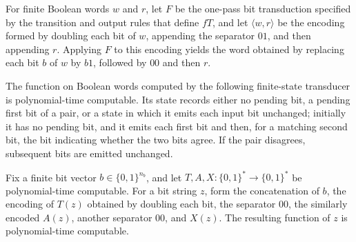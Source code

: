 \begin{theorem}
\label{Complexity.Meyer.fT_pairEncode}
\leanok
{}
For finite Boolean words $w$ and $r$, let $F$ be the one-pass bit transduction specified
by the transition and output rules that define $fT$, and let $\langle w,r\rangle$ be the
encoding formed by doubling each bit of $w$, appending the separator $01$, and then
appending $r$. Applying $F$ to this encoding yields the word obtained by replacing each
bit $b$ of $w$ by $b1$, followed by $00$ and then $r$.
\end{theorem}

\begin{theorem}
\label{Complexity.Meyer.pt_fT}
\leanok
{}
The function on Boolean words computed by the following finite-state transducer is
polynomial-time computable. Its state records either no pending bit, a pending first bit
of a pair, or a state in which it emits each input bit unchanged; initially it has no
pending bit, and it emits each first bit and then, for a matching second bit, the bit
indicating whether the two bits agree. If the pair disagrees, subsequent bits are
emitted unchanged.
\end{theorem}

\begin{theorem}
\label{Complexity.Meyer.pt_query}
\leanok
{}
Fix a finite bit vector $b\in\{0,1\}^{n_b}$, and let $T,A,X:\{0,1\}^*\to\{0,1\}^*$ be
polynomial-time computable. For a bit string $z$, form the concatenation of $b$, the
encoding of $T(z)$ obtained by doubling each bit, the separator $00$, the similarly
encoded $A(z)$, another separator $00$, and $X(z)$. The resulting function of $z$ is
polynomial-time computable.
\end{theorem}

